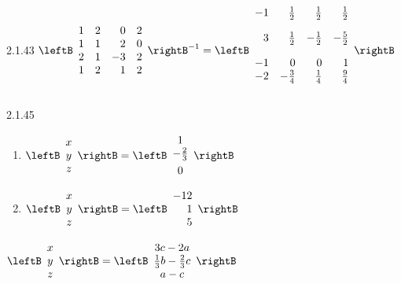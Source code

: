 \begin{Answer}{2.1.43}
$\leftB
\begin{array}{rrrr}
1 & 2 & 0 & 2 \\
1 & 1 & 2 & 0 \\
2 & 1 & -3 & 2 \\
1 & 2 & 1 & 2
\end{array}
\rightB^{-1}= \leftB
\begin{array}{rrrr}
-1 & \vspace{0.05in}\frac{1}{2} &  \vspace{0.05in}\frac{1}{2} &  \vspace{0.05in}\frac{1}{2} \\
3 &  \vspace{0.05in}\frac{1}{2} & - \vspace{0.05in}\frac{1}{2} & - \vspace{0.05in}\frac{5}{2} \\
-1 & 0 & 0 & 1 \\
-2 & - \vspace{0.05in}\frac{3}{4} &  \vspace{0.05in}\frac{1}{4} &  \vspace{0.05in}\frac{9}{4}
\end{array}
\rightB$
\end{Answer}
\begin{Answer}{2.1.45}
\begin{enumerate}
\item $\leftB
\begin{array}{c}
x \\
y \\
z
\end{array}
\rightB =\leftB
\begin{array}{c}
1 \\
-\vspace{0.05in}\frac{2}{3} \\
0
\end{array}
\rightB$
\item $\leftB
\begin{array}{c}
x \\
y \\
z
\end{array}
\rightB = \leftB
\begin{array}{r}
-12 \\
1 \\
5
\end{array}
\rightB$
\end{enumerate}

$\leftB
\begin{array}{c}
x \\
y \\
z
\end{array}
\rightB =
\leftB
\begin{array}{c}
3c-2a \\
\frac{1}{3}b-\frac{2}{3}c \\
a-c
\end{array}
\rightB$
\end{Answer}
